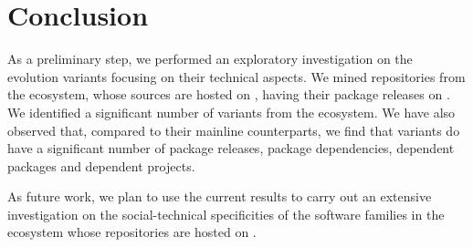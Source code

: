 \section{Conclusion}
\label{sec:conclusion}
As a preliminary step, we performed an exploratory investigation on the evolution variants focusing on their technical aspects. We mined repositories from the \js ecosystem, whose sources are hosted on \gh, having their package releases on \npm.
We identified a significant number of variants from the \js ecosystem. We have also observed that, compared to their mainline counterparts, we find that variants do have a significant number of package releases, package dependencies, dependent packages and dependent projects.

As future work, we plan to use the current results to carry out an extensive investigation on the social-technical specificities of the software families in the \js ecosystem whose repositories are hosted on \gh. 

